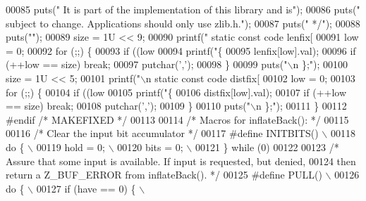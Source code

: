 \begin{DoxyCode}
00085     puts(\textcolor{stringliteral}{"       It is part of the implementation of this library and is"});
00086     puts(\textcolor{stringliteral}{"       subject to change. Applications should only use zlib.h."});
00087     puts(\textcolor{stringliteral}{"     */"});
00088     puts(\textcolor{stringliteral}{""});
00089     size = 1U << 9;
00090     printf(\textcolor{stringliteral}{"    static const code lenfix[%
00091     low = 0;
00092     \textcolor{keywordflow}{for} (;;) \{
00093         \textcolor{keywordflow}{if} ((low %
00094         printf(\textcolor{stringliteral}{"\{%
00095                lenfix[low].val);
00096         \textcolor{keywordflow}{if} (++low == size) \textcolor{keywordflow}{break};
00097         putchar(\textcolor{charliteral}{','});
00098     \}
00099     puts(\textcolor{stringliteral}{"\(\backslash\)n    \};"});
00100     size = 1U << 5;
00101     printf(\textcolor{stringliteral}{"\(\backslash\)n    static const code distfix[%
00102     low = 0;
00103     \textcolor{keywordflow}{for} (;;) \{
00104         \textcolor{keywordflow}{if} ((low %
00105         printf(\textcolor{stringliteral}{"\{%
00106                distfix[low].val);
00107         \textcolor{keywordflow}{if} (++low == size) \textcolor{keywordflow}{break};
00108         putchar(\textcolor{charliteral}{','});
00109     \}
00110     puts(\textcolor{stringliteral}{"\(\backslash\)n    \};"});
00111 \}
00112 \textcolor{preprocessor}{#endif }\textcolor{comment}{/* MAKEFIXED */}\textcolor{preprocessor}{}
00113 
00114 \textcolor{comment}{/* Macros for inflateBack(): */}
00115 
00116 \textcolor{comment}{/* Clear the input bit accumulator */}
00117 \textcolor{preprocessor}{#define INITBITS() \(\backslash\)}
00118 \textcolor{preprocessor}{    do \{ \(\backslash\)}
00119 \textcolor{preprocessor}{        hold = 0; \(\backslash\)}
00120 \textcolor{preprocessor}{        bits = 0; \(\backslash\)}
00121 \textcolor{preprocessor}{    \} while (0)}
00122 
00123 \textcolor{comment}{/* Assure that some input is available.  If input is requested, but denied,}
00124 \textcolor{comment}{   then return a Z\_BUF\_ERROR from inflateBack(). */}
00125 \textcolor{preprocessor}{#define PULL() \(\backslash\)}
00126 \textcolor{preprocessor}{    do \{ \(\backslash\)}
00127 \textcolor{preprocessor}{        if (have == 0) \{ \(\backslash\)}
}}}}
\end{DoxyCode}
